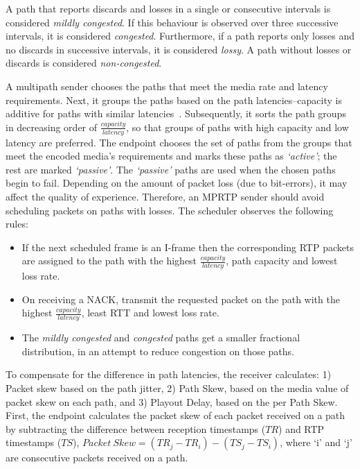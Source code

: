 A path that reports discards and losses in a single or consecutive intervals
is considered \emph{mildly congested}. If this behaviour is observed over three
successive intervals, it is considered \emph{congested}. Furthermore, if a
path reports only losses and no discards in successive intervals, it is
considered \emph{lossy}. A path without losses or discards is considered
\emph{non-congested}.

A multipath sender chooses the paths that meet the media rate and latency
requirements. Next, it groups the paths based on the path latencies--capacity
is additive for paths with similar latencies~\cite{Wischik:2008:RPP}.
Subsequently, it sorts the path groups in decreasing order of
$\frac{capacity}{latency}$, so that groups of paths with high capacity 
and low latency are preferred. 
The endpoint chooses the set of paths from the groups that meet
the encoded media's requirements and marks these paths as \emph{`active'}; the rest
are marked \emph{`passive'}. The \emph{`passive'} paths are used when the
chosen paths begin to fail. Depending on the amount of packet loss (due
to bit-errors), it may affect the quality of experience. Therefore, an MPRTP
sender should avoid scheduling packets on paths with losses. The scheduler
observes the following rules:

\begin{itemize}
\setlength{\itemsep}{0pt}

  \item If the next scheduled frame is an I-frame then the corresponding RTP
  packets are assigned to the path with the highest $\frac{capacity}{latency}$,
  path capacity and lowest loss rate.

  \item On receiving a NACK, transmit the requested packet on the path with
  the highest $\frac{capacity}{latency}$, least RTT and lowest loss rate.

  \item The \emph{mildly congested} and \emph{congested} paths get a smaller
  fractional distribution, in an attempt to reduce congestion on those paths.

\end{itemize}

To compensate for the difference in path latencies, the receiver calculates:
1) Packet skew based on the path jitter, 2) Path Skew, based on the media
value of packet skew on each path, and 3) Playout Delay, based on the per
Path Skew. First, the endpoint calculates the packet skew of each packet
received on a path by subtracting the difference between reception timestamps
($TR$) and RTP timestamps ($TS$), $Packet\ Skew = (TR_j - TR_i) - (TS_j -
TS_i)$, where `i' and `j' are consecutive packets received on a path.

